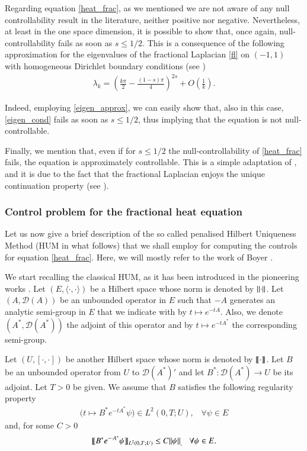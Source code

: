 Regarding equation \eqref{heat_frac}, as we mentioned we are not aware of any null controllability result in the literature, neither positive nor negative. Nevertheless, at least in the one space dimension, it is possible to show that, once again, null-controllability fails as soon as $s\leq 1/2$. This is a consequence of the following approximation for the eigenvalues of the fractional Laplacian \eqref{fl} on $(-1,1)$ with homogeneous Dirichlet boundary conditions (see \cite{kulczycki2010spectral,kwasnicki2012eigenvalues}) 
\begin{align}\label{eigen_approx}
	\lambda_k = \left(\frac{k\pi}{2}-\frac{(1-s)\pi}{4}\right)^{2s}+O\left(\frac{1}{k}\right).
\end{align} 

Indeed, employing \eqref{eigen_approx}, we can easily show that, also in this case, \eqref{eigen_cond} fails as soon as $s\leq 1/2$, thus implying that the equation is not null-controllable. 

Finally, we mention that, even if for $s\leq 1/2$ the null-controllability of \eqref{heat_frac} fails, the equation is approximately controllable. This is a simple adaptation of \cite[Proposition 2.4 and Theorem 2.5]{keyantuo2016interior}, and it is due to the fact that the fractional Laplacian enjoys the unique continuation property (see \cite{fall2014unique}).      

\subsubsection{Control problem for the fractional heat equation}

Let us now give a brief description of the so called penalised Hilbert Uniqueness Method (HUM in what follows) that we shall employ for computing the controls for equation \eqref{heat_frac}. Here, we will mostly refer to the work of Boyer \cite{boyer2013penalised}.

We start recalling the classical HUM, as it has been introduced in the pioneering works \cite{glowinski1995exact,glowinski2008exact}. Let $(E,\langle\cdot,\cdot\rangle)$ be a Hilbert space whose norm is denoted by ${\left\|\cdot\right\|}_{}$. Let $(A,\mathcal D(A))$ be an unbounded operator in $E$ such that $-A$ generates an analytic semi-group in $E$ that we indicate with by $t\mapsto e^{-tA}$. Also, we denote $(A^*,\mathcal D(A^*))$ the adjoint of this operator and by $t\mapsto e^{-tA^*}$ the corresponding semi-group. 

Let $(U,[\cdot,\cdot])$ be another Hilbert space whose norm is denoted by $\llbracket \cdot\rrbracket$. Let  $B$ be an unbounded operator from $U$ to $\mathcal D(A^*)'$ and let $B^*:\mathcal D(A^*)\to U$ be its adjoint. Let $T>0$ be given. We assume that $B$ satisfies the following regularity property
\begin{align*}
	\Big(t\mapsto B^*e^{-tA^*}\psi\Big)\in L^2(0,T;U),\;\;\;\forall\psi\in E 
\end{align*}
and, for some $C>0$
\begin{align*}
	\llbracket B^*e^{-\cdot A^*}\psi\rrbracket_{L^2(0,T;U)}\leq C{\left\|\psi\right\|}_{,}\;\;\;\forall\psi\in E. 
\end{align*}

